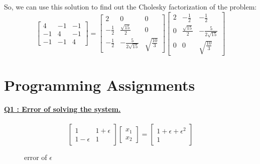 \documentclass{article}
\begin{document}
So, we can use this solution to find out the Cholesky factorization of the problem:
\[
{\begin{bmatrix}
4 &-1 &-1\\
-1& 4 &-1\\
-1&-1 & 4
\end{bmatrix}}
=
{\begin{bmatrix}
2 & 0 & 0\\
-\frac{1}{2}& \frac{\sqrt{15}}{2} & 0\\
-\frac{1}{2}& -\frac{5}{2\sqrt{15}} & \sqrt{\frac{10}{3}}
\end{bmatrix}}
{\begin{bmatrix}
2 & -\frac{1}{2} & -\frac{1}{2}\\
0& \frac{\sqrt{15}}{2} &-\frac{5}{2\sqrt{15}}\\
0&0 & \sqrt{\frac{10}{3}}
\end{bmatrix}}
\]




\section{Programming Assignments}
\underline{\textbf{Q1 : Error of solving the system.\\}}\\
\[
{\begin{bmatrix}
1 & 1+\epsilon\\
1-\epsilon& 1
\end{bmatrix}}
{\begin{bmatrix}
x_1\\
x_2
\end{bmatrix}}
=
{\begin{bmatrix}
1+\epsilon+\epsilon^2\\
1
\end{bmatrix}}
\]
\begin{figure}[h]
    \centering
    \caption{error of $\epsilon$}
    \label{fig1}
\end{figure}
\end{document}
